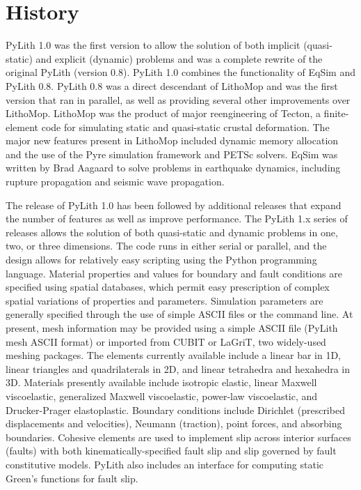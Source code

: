 \section{History}

PyLith 1.0 was the first version to allow the solution of both
implicit (quasi-static) and explicit (dynamic) problems and was a
complete rewrite of the original PyLith (version 0.8). PyLith 1.0
combines the functionality of EqSim
\cite{Aagaard:etal:2001a,Aagaard:etal:2001b} and PyLith 0.8. PyLith
0.8 was a direct descendant of LithoMop and was the first version that
ran in parallel, as well as providing several other improvements over
LithoMop. LithoMop was the product of major reengineering of Tecton, a
finite-element code for simulating static and quasi-static crustal
deformation. The major new features present in LithoMop included
dynamic memory allocation and the use of the Pyre simulation framework
and PETSc solvers. EqSim was written by Brad Aagaard to solve problems
in earthquake dynamics, including rupture propagation and seismic wave
propagation.

The release of PyLith 1.0 has been followed by additional releases
that expand the number of features as well as improve performance.
The PyLith 1.x series of releases allows the solution of both
quasi-static and dynamic problems in one, two, or three
dimensions. The code runs in either serial or parallel, and the design
allows for relatively easy scripting using the Python programming
language. Material properties and values for boundary and fault
conditions are specified using spatial databases, which permit easy
prescription of complex spatial variations of properties and
parameters. Simulation parameters are generally specified through the
use of simple ASCII files or the command line.  At present, mesh
information may be provided using a simple ASCII file (PyLith mesh
ASCII format) or imported from CUBIT or LaGriT, two widely-used
meshing packages. The elements currently available include a linear
bar in 1D, linear triangles and quadrilaterals in 2D, and linear
tetrahedra and hexahedra in 3D. Materials presently available include
isotropic elastic, linear Maxwell viscoelastic, generalized Maxwell
viscoelastic, power-law viscoelastic, and Drucker-Prager
elastoplastic. Boundary conditions include Dirichlet (prescribed
displacements and velocities), Neumann (traction), point forces, and
absorbing boundaries.  Cohesive elements are used to implement slip
across interior surfaces (faults) with both kinematically-specified
fault slip and slip governed by fault constitutive models. PyLith also
includes an interface for computing static Green's functions for fault
slip.

